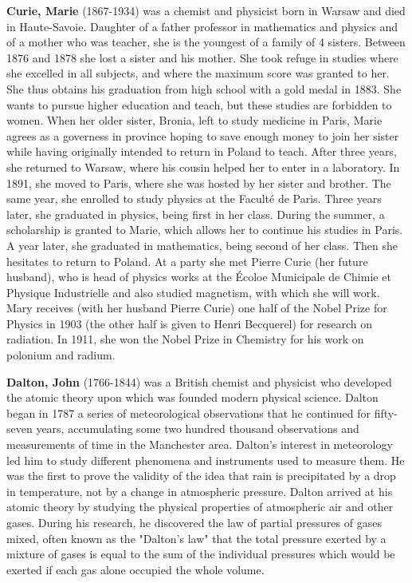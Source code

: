 \textbf{Curie, Marie} (1867-1934) was a chemist and physicist born in Warsaw and died in Haute-Savoie. Daughter of a father professor in mathematics and physics and of a mother who was teacher, she is the youngest of a family of 4 sisters. Between 1876 and 1878 she lost a sister and his mother. She took refuge in studies where she excelled in all subjects, and where the maximum score was granted to her. She thus obtains his graduation from high school with a gold medal in 1883. She wants to pursue higher education and teach, but these studies are forbidden to women. When her older sister, Bronia, left to study medicine in Paris, Marie agrees as a governess in province hoping to save enough money to join her sister while having originally intended to return in Poland to teach. After three years, she returned to Warsaw, where his cousin helped her to enter in a laboratory. In 1891, she moved to Paris, where she was hosted by her sister and brother. The same year, she enrolled to study physics at the Faculté de Paris. Three years later, she graduated in physics, being first in her class. During the summer, a scholarship is granted to Marie, which allows her to continue his studies in Paris. A year later, she graduated in mathematics, being second of her class. Then she hesitates to return to Poland. At a party she met Pierre Curie (her future husband), who is head of physics works at the Écoloe Municipale de Chimie et Physique Industrielle and also studied magnetism, with which she will work. Mary receives (with her husband Pierre Curie) one half of the Nobel Prize for Physics in 1903 (the other half is given to Henri Becquerel) for research on radiation. In 1911, she won the Nobel Prize in Chemistry for his work on polonium and radium.

{}	

\textbf{Dalton, John} (1766-1844) was a British chemist and physicist who developed the atomic theory upon which was founded modern physical science. Dalton began in 1787 a series of meteorological observations that he continued for fifty-seven years, accumulating some two hundred thousand observations and measurements of time in the Manchester area. Dalton's interest in meteorology led him to study different phenomena and instruments used to measure them. He was the first to prove the validity of the idea that rain is precipitated by a drop in temperature, not by a change in atmospheric pressure. Dalton arrived at his atomic theory by studying the physical properties of atmospheric air and other gases. During his research, he discovered the law of partial pressures of gases mixed, often known as the "Dalton's law" that the total pressure exerted by a mixture of gases is equal to the sum of the individual pressures which would be exerted if each gas alone occupied the whole volume.

